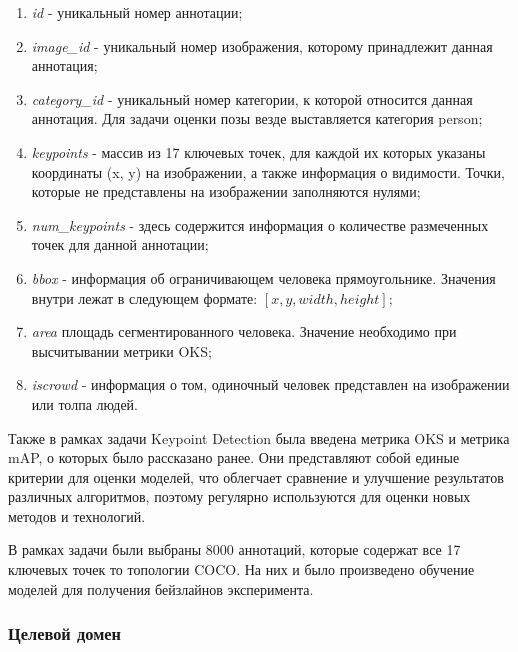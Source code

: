 \begin{enumerate}

\item \textit{id} - уникальный номер аннотации;

\item \textit{image\_id} - уникальный номер изображения, которому принадлежит данная аннотация;

\item \textit{category\_id} - уникальный номер категории, к которой относится данная аннотация. Для задачи оценки позы везде выставляется категория person;

\item \textit{keypoints} - массив из 17 ключевых точек, для каждой их которых указаны координаты (x, y) на изображении, а также информация о видимости. Точки, которые не представлены на изображении заполняются нулями;

\item \textit{num\_keypoints} - здесь содержится информация о количестве размеченных точек для данной аннотации;

\item \textit{bbox} - информация об ограничивающем человека прямоугольнике. Значения внутри лежат в следующем формате: $[x, y, width, height]$;

\item \textit{area} площадь сегментированного человека. Значение необходимо при высчитывании метрики OKS;

\item \textit{iscrowd} - информация о том, одиночный человек представлен на изображении или толпа людей.

\end{enumerate}

Также в рамках задачи Keypoint Detection была введена метрика OKS и метрика mAP, о которых было рассказано ранее. Они представляют собой единые критерии для оценки моделей, что облегчает сравнение и улучшение результатов различных алгоритмов, поэтому регулярно используются для оценки  новых методов и технологий.

В рамках задачи были выбраны 8000 аннотаций, которые содержат все 17 ключевых точек то топологии COCO. На них и было произведено обучение моделей для получения бейзлайнов эксперимента.

\subsubsection*{Целевой домен}

